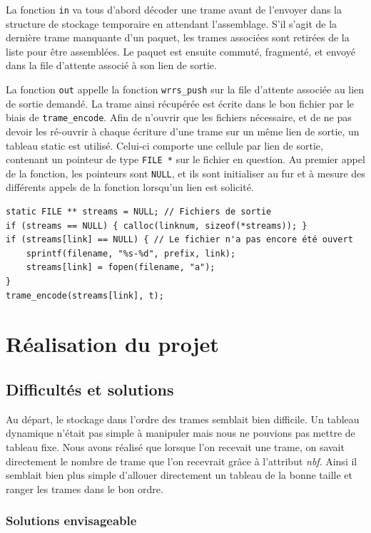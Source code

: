 \documentclass[a4paper,11pt]{article}
\begin{document}
La fonction \texttt{in} va tous d'abord décoder une trame avant de
l'envoyer dans la structure de stockage temporaire en attendant
l'assemblage. S'il s'agit de la dernière trame manquante d'un paquet,
les trames associées sont retirées de la liste pour être assemblées. Le
paquet est ensuite commuté, fragmenté, et envoyé dans la file d'attente
associé à son lien de sortie.

La fonction \texttt{out} appelle la fonction \texttt{wrrs\_push} sur la
file d'attente associée au lien de sortie demandé. La trame ainsi
récupérée est écrite dans le bon fichier par le biais de 
\texttt{trame\_encode}. Afin de n'ouvrir que les fichiers nécessaire, et
de ne pas devoir les ré-ouvrir à chaque écriture d'une trame sur un même
lien de sortie, un tableau static est utilisé. Celui-ci comporte une
cellule par lien de sortie, contenant un pointeur de type \texttt{FILE *}
sur le fichier en question. Au premier appel de la fonction, les pointeurs
sont \texttt{NULL}, et ils sont initialiser au fur et à mesure des
différents appels de la fonction lorsqu'un lien est solicité.
\begin{verbatim}
static FILE ** streams = NULL; // Fichiers de sortie
if (streams == NULL) { calloc(linknum, sizeof(*streams)); }
if (streams[link] == NULL) { // Le fichier n'a pas encore été ouvert
    sprintf(filename, "%s-%d", prefix, link);
    streams[link] = fopen(filename, "a");
}
trame_encode(streams[link], t);
\end{verbatim}



\section{Réalisation du projet}

\subsection{Difficultés et solutions}

Au départ, le stockage dans l'ordre des trames semblait bien difficile. Un tableau dynamique n'était pas simple à manipuler mais nous ne pouvions pas mettre de tableau fixe. Nous avons réalisé que lorsque l'on recevait une trame, on savait directement le nombre de trame que l'on recevrait grâce à l'attribut \textit{nbf}. Ainsi il semblait bien plus simple d'allouer directement un tableau de la bonne taille et ranger les trames dans le bon ordre.

\subsubsection{Solutions envisageable}
\end{document}
